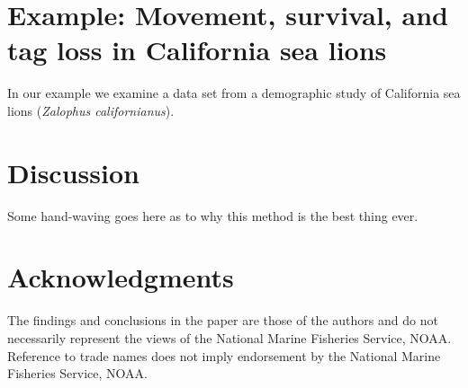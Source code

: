\documentclass[sts]{imsart}
\numberwithin{equation}{section}
\theoremstyle{plain}
\begin{document}
\section{Example: Movement, survival, and tag loss in California sea lions}

In our example we examine a data set from a demographic study of California sea lions ({\it Zalophus californianus}). 


\section{Discussion}

Some hand-waving goes here as to why this method is the best thing ever.


\section*{Acknowledgments}
The findings and conclusions in the paper are those of the authors and do not necessarily represent the views of the National Marine Fisheries Service, NOAA. Reference to trade names does not imply endorsement by the National Marine Fisheries Service, NOAA.

\begin{supplement}[id=suppA]
\end{supplement}





\clearpage
\end{document}
